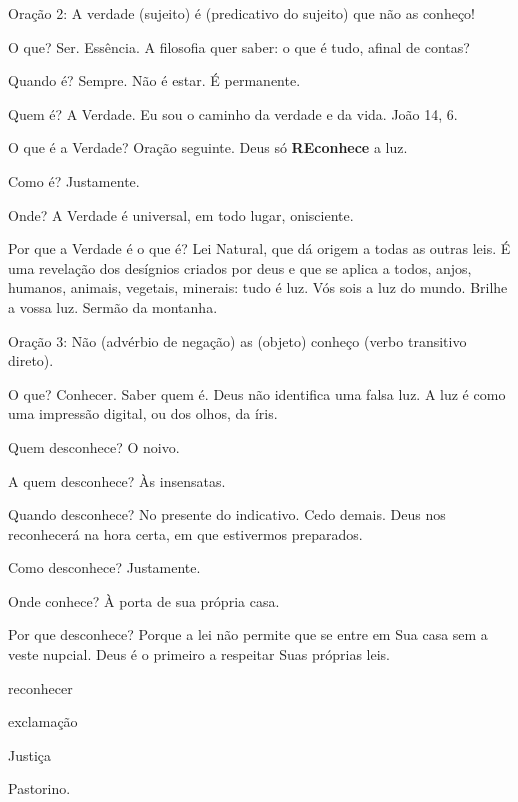 \documentclass{rbfin}
\begin{document}
\newpage

Oração 2: A verdade (sujeito) é (predicativo do sujeito) que não as conheço!

O que? Ser. Essência. A filosofia quer saber: o que é tudo, afinal de contas?

Quando é? Sempre. Não é estar. É permanente.

Quem é? A Verdade. Eu sou o caminho da verdade e da vida. João 14, 6.

O que é a Verdade? Oração seguinte. Deus só \textbf{REconhece} a luz.

Como é? Justamente.

Onde? A Verdade é universal, em todo lugar, onisciente.

Por que a Verdade é o que é? Lei Natural, que dá origem a todas as outras leis. É uma revelação dos desígnios criados por deus e que se aplica a todos, anjos, humanos, animais, vegetais, minerais: tudo é luz. Vós sois a luz do mundo. Brilhe a vossa luz. Sermão da montanha.

\newpage

Oração 3: Não (advérbio de negação) as (objeto) conheço (verbo transitivo direto).

O que? Conhecer. Saber quem é. Deus não identifica uma falsa luz. A luz é como uma impressão digital, ou dos olhos, da íris.

Quem desconhece? O noivo.

A quem desconhece? Às insensatas.

Quando desconhece? No presente do indicativo. Cedo demais. Deus nos reconhecerá na hora certa, em que estivermos preparados.

Como desconhece? Justamente.

Onde conhece? À porta de sua própria casa.

Por que desconhece? Porque a lei não permite que se entre em Sua casa sem a veste nupcial. Deus é o primeiro a respeitar Suas próprias leis.

\newpage

reconhecer

exclamação

Justiça

Pastorino.
\end{document}
